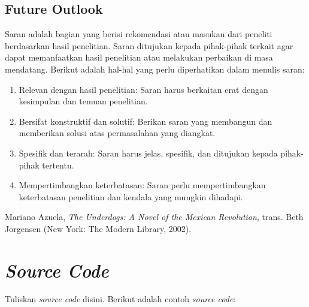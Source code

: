 \documentclass[english,12pt,a4paper]{book}
\begin{document}
\section{Future Outlook}
Saran adalah bagian yang berisi rekomendasi atau masukan dari peneliti berdasarkan hasil penelitian. Saran ditujukan kepada pihak-pihak terkait agar dapat memanfaatkan hasil penelitian atau melakukan perbaikan di masa mendatang. Berikut adalah hal-hal yang perlu diperhatikan dalam menulis saran:
\begin{enumerate}
	\item Relevan dengan hasil penelitian: Saran harus berkaitan erat dengan kesimpulan dan temuan penelitian.
	\item Bersifat konstruktif dan solutif: Berikan saran yang membangun dan memberikan solusi atas permasalahan yang diangkat.
	\item Spesifik dan terarah: Saran harus jelas, spesifik, dan ditujukan kepada pihak-pihak tertentu.
	\item Mempertimbangkan keterbatasan: Saran perlu mempertimbangkan keterbatasan penelitian dan kendala yang mungkin dihadapi.
\end{enumerate}

\begin{thebibliography}{9} 
	 Mariano Azuela, \textit{The Underdogs: A Novel of the Mexican Revolution}, trans. Beth Jorgensen (New York: The Modern Library, 2002). 
\end{thebibliography}

\appendix
	\chapter{\textit{Source Code}}
	Tuliskan \textit{source code} disini. Berikut adalah contoh \textit{source code}:
\end{document}
